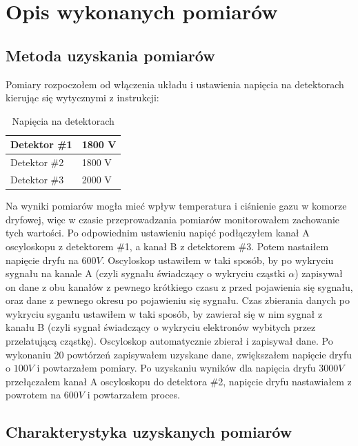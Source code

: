 \documentclass[10pt,a4paper]{article}
\begin{document}
\section{Opis wykonanych pomiarów}

\subsection{Metoda uzyskania pomiarów}

Pomiary rozpoczołem od włączenia układu i ustawienia napięcia na detektorach kierując się wytycznymi z instrukcji:

\begin{table}[h]
    \centering
    \caption{Napięcia na detektorach \cite{instrukcja}}
    \label{napiecia}
    \begin{tabular}{|l|l|}
        \hline
        Detektor \#1 & 1800 V \\ \hline
        Detektor \#2 & 1800 V \\ \hline
        Detektor \#3 & 2000 V \\ \hline
    \end{tabular}
\end{table}

Na wyniki pomiarów mogła mieć wpływ temperatura i ciśnienie gazu w komorze dryfowej, więc w czasie przeprowadzania pomiarów monitorowałem zachowanie tych wartości. Po odpowiednim ustawieniu napięć podłączyłem kanał A oscyloskopu z detektorem \#1, a kanał B z detektorem \#3. Potem nastaiłem napięcie dryfu na $600 V$. Oscyloskop ustawiłem w taki sposób, by po wykryciu sygnału na kanale A (czyli sygnału świadczący o wykryciu cząstki $\alpha$) zapisywał on dane z obu kanałów z pewnego krótkiego czasu z przed pojawienia się sygnału, oraz dane z pewnego okresu po pojawieniu się sygnału. Czas zbierania danych po wykryciu syganłu ustawiłem w taki sposób, by zawierał się w nim sygnał z kanału B (czyli sygnał świadczący o wykryciu elektronów wybitych przez przelatującą cząstkę). Oscyloskop automatycznie zbierał i zapisywał dane. Po wykonaniu 20 powtórzeń zapisywałem uzyskane dane, zwiększałem napięcie dryfu o $100 V$ i powtarzałem pomiary. Po uzyskaniu wyników dla napięcia dryfu $3000 V$ przełączałem kanał A oscyloskopu do detektora \#2, napięcie dryfu nastawiałem z powrotem na $600 V$ i powtarzałem proces.

\subsection{Charakterystyka uzyskanych pomiarów}
\end{document}
